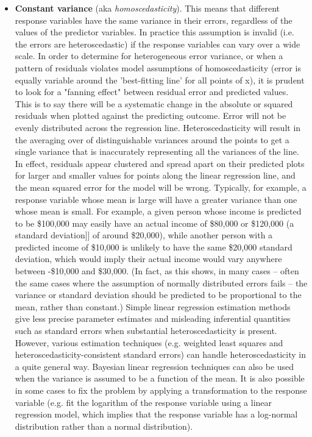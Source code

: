 \begin{itemize}
  \item \textbf{Constant variance} (aka \emph{homoscedasticity}).  This means that different response variables have the same variance in their errors, regardless of the values of the predictor variables. In practice this assumption is invalid (i.e. the errors are heteroscedastic) if the response variables can vary over a wide scale. In order to determine for heterogeneous error variance, or when a pattern of residuals violates model assumptions of homoscedasticity (error is equally variable around the 'best-fitting line' for all points of x), it is prudent to look for a "fanning effect" between residual error and predicted values. This is to say there will be a systematic change in the absolute or squared residuals when plotted against the predicting outcome. Error will not be evenly distributed across the regression line. Heteroscedasticity will result in the averaging over of distinguishable variances around the points to get a single variance that is inaccurately representing all the variances of the line. In effect, residuals appear clustered and spread apart on their predicted plots for larger and smaller values for points along the linear regression line, and the mean squared error for the model will be wrong. Typically, for example, a response variable whose mean is large will have a greater variance than one whose mean is small. For example, a given person whose income is predicted to be \$100,000 may easily have an actual income of \$80,000 or \$120,000 (a standard deviation]] of around \$20,000), while another person with a predicted income of \$10,000 is unlikely to have the same \$20,000 standard deviation, which would imply their actual income would vary anywhere between -\$10,000 and \$30,000. (In fact, as this shows, in many cases – often the same cases where the assumption of normally distributed errors fails – the variance or standard deviation should be predicted to be proportional to the mean, rather than constant.) Simple linear regression estimation methods give less precise parameter estimates and misleading inferential quantities such as standard errors when substantial heteroscedasticity is present. However, various estimation techniques (e.g. weighted least squares and heteroscedasticity-consistent standard errors) can handle heteroscedasticity in a quite general way. Bayesian linear regression techniques can also be used when the variance is assumed to be a function of the mean. It is also possible in some cases to fix the problem by applying a transformation to the response variable (e.g. fit the logarithm of the response variable using a linear regression model, which implies that the response variable has a log-normal distribution rather than a normal distribution).


\end{itemize}
